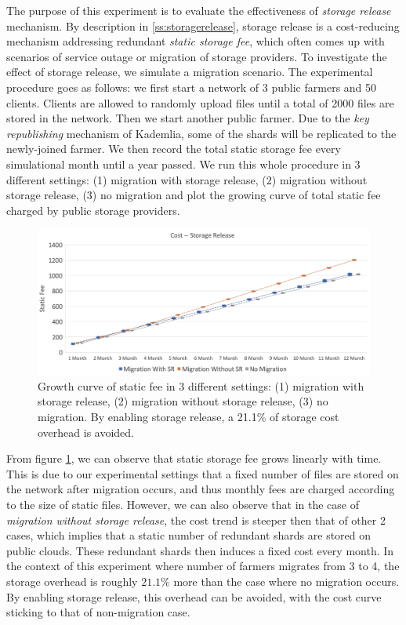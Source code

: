 The purpose of this experiment is to evaluate the effectiveness of \textit{storage release} mechanism. By description in \ref{ss:storagerelease}, storage release is a cost-reducing mechanism addressing redundant \textit{static storage fee}, which often comes up with scenarios of service outage or migration of storage providers. To investigate the effect of storage release, we simulate a migration scenario. The experimental procedure goes as follows: we first start a network of 3 public farmers and 50 clients. Clients are allowed to randomly upload files until a total of 2000 files are stored in the network. Then we start another public farmer. Due to the \textit{key republishing} mechanism of Kademlia, some of the shards will be replicated to the newly-joined farmer. We then record the total static storage fee every simulational month until a year passed. We run this whole procedure in 3 different settings: (1) migration with storage release, (2) migration without storage release, (3) no migration and plot the growing curve of total static fee charged by public storage providers.

\begin{figure}[hbt]
  \centering
    \includegraphics[width=14cm]{charts/chart_cost_storage_release.png}
    \caption[Growth curve of static fee in 3 different settings: (1) migration with storage release, (2) migration without storage release, (3) no migration]{Growth curve of static fee in 3 different settings: (1) migration with storage release, (2) migration without storage release, (3) no migration. By enabling storage release, a 21.1\% of storage cost overhead is avoided.}
    \label{fig:coststoragerelease}
\end{figure}

From figure \ref{fig:coststoragerelease}, we can observe that static storage fee grows linearly with time. This is due to our experimental settings that a fixed number of files are stored on the network after migration occurs, and thus monthly fees are charged according to the size of static files. However, we can also observe that in the case of \textit{migration without storage release}, the cost trend is steeper then that of other 2 cases, which implies that a static number of redundant shards are stored on public clouds. These redundant shards then induces a fixed cost every month. In the context of this experiment where number of farmers migrates from 3 to 4, the storage overhead is roughly $21.1\%$ more than the case where no migration occurs. By enabling storage release, this overhead can be avoided, with the cost curve sticking to that of non-migration case.

